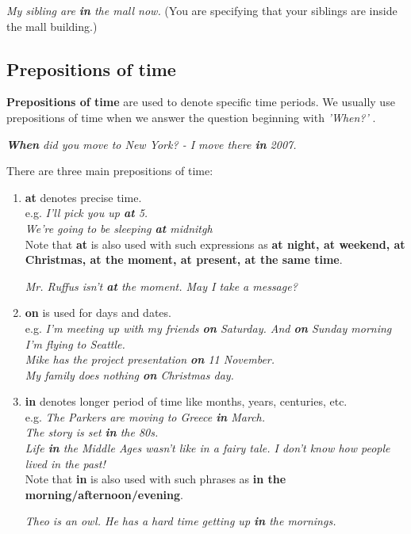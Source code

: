\documentclass[hidelinks,10pt,a4paper]{article}
\begin{document}
\textit{My sibling are \textbf{in} the mall now.} (You are specifying that your siblings are inside the mall building.)

\subsection{Prepositions of time}
\textbf{Prepositions of time} are used to denote specific time periods. We usually use prepositions of time when we answer the question beginning with \textit{'When?'} .

\begin{center}
	\textit{\textbf{When} did you move to New York? - I move there \textbf{in} 2007. }
\end{center}

There are three main prepositions of time:
\begin{enumerate}[label=(\alph*)]
	\item \textbf{at} denotes precise time. \\
		e.g. \textit{I'll pick you up \textbf{at} 5.\\
		We're going to be sleeping \textbf{at} midnitgh}  \\

		Note that \textbf{at} is also used with such expressions as \textbf{at night, at weekend, at Christmas, at the moment, at present, at the same time}.

		\begin{center}
			\textit{Mr. Ruffus isn't \textbf{at} the moment. May I take a message?}
		\end{center}
	\item \textbf{on} is used for days and dates. \\
		e.g. \textit{I'm meeting up with my friends \textbf{on} Saturday. And \textbf{on} Sunday morning I'm flying to Seattle.}\\
		\textit{Mike has the project presentation \textbf{on} 11 November.}\\
		\textit{My family does nothing \textbf{on} Christmas day.}
	\item \textbf{in} denotes longer period of time like months, years, centuries, etc. \\
		e.g. \textit{The Parkers are moving to Greece \textbf{in} March.\\
		The story is set \textbf{in} the 80s.\\
		Life \textbf{in} the Middle Ages wasn't like in a fairy tale. I don't know how people lived in the past!} \\

		Note that \textbf{in} is also used with such phrases as \textbf{in the morning/afternoon/evening}.

		\begin{center}
			\textit{Theo is an owl. He has a hard time getting up \textbf{in} the mornings. }
		\end{center}

\end{enumerate}
\end{document}
